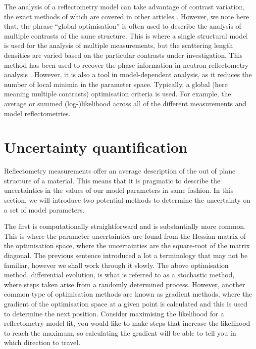 \documentclass[
 reprint,
 superscriptaddress,
 amsmath,amssymb,
 aps,
]{revtex4-1}
\begin{document}
The analysis of a reflectometry model can take advantage of contrast variation, the exact methods of which are covered in other articles \cite{schurtenberger_contrast_2002}.
However, we note here that, the phrase ``global optimisation'' is often used to describe the analysis of multiple contrasts of the same structure.
This is where a single structural model is used for the analysis of multiple measurements, but the scattering length densities are varied based on the particular contrasts under investigation.
This method has been used to recover the phase information in neutron reflectometry analysis \cite{majkrzak_exact_1995,majkrzak_first_2000,majkrzak_phase_2003,koutsioubas_model_2019}.
However, it is also a tool in model-dependent analysis, as it reduces the number of local minimia in the parameter space.
Typically, a global (here meaning multiple contrasts) optimisation criteria is used.
For example, the average or summed (log-)likelihood across all of the different measurements and model reflectometries.

\section{Uncertainty quantification}
Reflectometry measurements offer an average description of the out of plane structure of a material.
This means that it is pragmatic to describe the uncertainties in the values of our model parameters in same fashion.
In this section, we will introduce two potential methods to determine the uncertainty on a set of model parameters.

The first is computationally straightforward and is substantially more common.
This is where the parameter uncertainties are found from the Hessian matrix of the optimisation space, where the uncertainties are the square-root of the matrix diagonal.
The previous sentence introduced a lot a terminology that may not be familiar, however we shall work through it slowly.
The above optimisation method, differential evolution, is what is referred to as a stochastic method, where steps taken arise from a randomly determined process.
However, another common type of optimisation methods are known as gradient methods, where the gradient of the optimisation space at a given point is calculated and this is used to determine the next position.
Consider maximising the likelihood for a reflectometry model fit, you would like to make steps that increase the likelihood to reach the maximum, so calculating the gradient will be able to tell you in which direction to travel.
\end{document}
